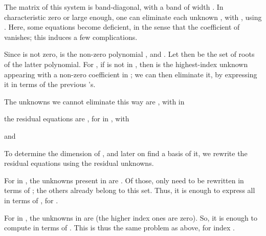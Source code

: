 \documentclass{sig-alternate}
\begin{document}
The matrix of this system is band-diagonal, with a band of width
. In characteristic zero or large enough, one can eliminate each
unknown , with , using . Here, some equations
 become deficient, in the sense that the coefficient of
 vanishes; this induces a few complications.

\smallskip{}
Since  is not zero,  is the non-zero
polynomial , and
.  Let then 
be the set of roots of the latter polynomial. For ,
if  is not in , then  is the highest-index
unknown appearing with a non-zero coefficient in ; we can
then eliminate it, by expressing it in terms of the previous 's.

The unknowns we cannot eliminate this way are , with  in 
 
the residual equations are ,
for  in , with

and 

To determine the dimension of , and later on find a basis
of it, we rewrite the residual equations using the residual unknowns.

For  in , the unknowns present in  are
. Of those, only
 need to be rewritten in terms of ; the others already belong to this set. Thus, it is
enough to express all  in terms of , for .

For  in , the unknowns in  are
 (the higher index ones are zero). So, it is
enough to compute  in terms of . This is thus the same problem as above, for index .
\end{document}

